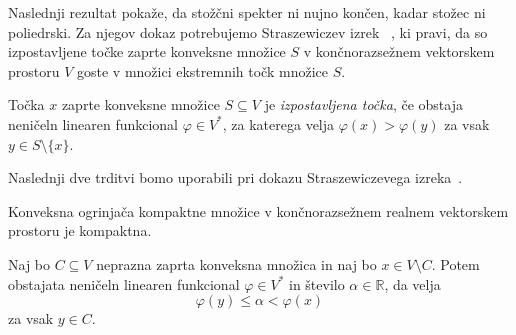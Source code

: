 \documentclass[mat2, tisk]{fmfdelo}
\begin{document}
Naslednji rezultat pokaže, da stožčni spekter ni nujno končen, kadar
stožec ni poliedrski. Za njegov dokaz potrebujemo Straszewiczev izrek
~\cite[str.~167]{rockafellar}, ki pravi, da so izpostavljene
točke zaprte konveksne množice $S$ v končnorazsežnem vektorskem prostoru
$V$ goste v množici ekstremnih točk množice $S$.

\begin{definicija}
  Točka $x$ zaprte konveksne množice $S\subseteq V$
  je \emph{izpostavljena točka}, če obstaja neničeln
  linearen funkcional $\varphi\in V^*$, za katerega velja
  $\varphi(x)>\varphi(y)$ za vsak $y\in S\setminus\{x\}$.
\end{definicija}

Naslednji dve trditvi bomo uporabili pri dokazu Straszewiczevega izreka~\cite{rockafellar}.

\begin{trditev}\label{trd:kompaktna_ogrinjaca}
Konveksna ogrinjača kompaktne množice v
končnorazsežnem realnem vektorskem prostoru
je kompaktna.
\end{trditev}

\begin{trditev}\label{trd:locitev_tocke}
Naj bo $C\subseteq V$ neprazna zaprta konveksna
množica in naj bo $x\in V\setminus C$.
Potem obstajata neničeln linearen funkcional
$\varphi\in V^*$ in število $\alpha\in\mathbb{R}$,
da velja
\[
\varphi(y)\leq\alpha<\varphi(x)
\]
za vsak $y\in C$.
\end{trditev}
\end{document}
